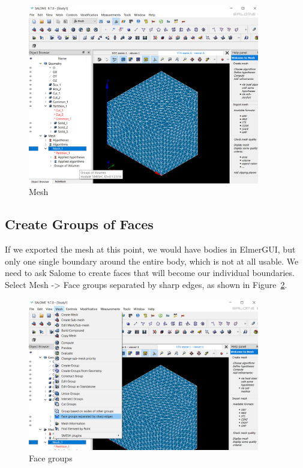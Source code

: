 \begin{figure}[H]
\centering
\includegraphics[width=0.9\textwidth]{Salome-25}
\caption{Mesh}\label{fg:salome-25}
\end{figure}

\subsection{Create Groups of Faces}

If we exported the mesh at this point, we would have bodies in ElmerGUI, but only one single boundary around the entire body, which is not at all usable.  We need to ask Salome to create faces that will become our individual boundaries.  Select Mesh -> Face groups separated by sharp edges, as shown in Figure~\ref{fg:salome-26}.

\begin{figure}[H]
\centering
\includegraphics[width=0.9\textwidth]{Salome-26}
\caption{Face groups}\label{fg:salome-26}
\end{figure}

